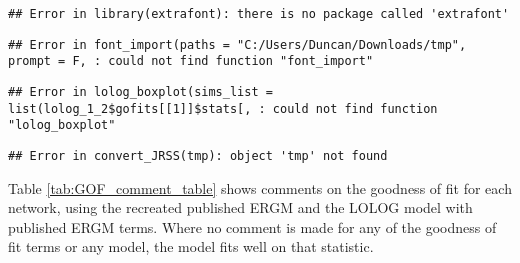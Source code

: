 \documentclass[
]{statsoc}
\begin{document}
\begin{verbatim}
## Error in library(extrafont): there is no package called 'extrafont'
\end{verbatim}

\begin{verbatim}
## Error in font_import(paths = "C:/Users/Duncan/Downloads/tmp", prompt = F, : could not find function "font_import"
\end{verbatim}

\begin{verbatim}
## Error in lolog_boxplot(sims_list = list(lolog_1_2$gofits[[1]]$stats[, : could not find function "lolog_boxplot"
\end{verbatim}

\begin{verbatim}
## Error in convert_JRSS(tmp): object 'tmp' not found
\end{verbatim}

Table \ref{tab:GOF_comment_table} shows comments on the goodness of fit
for each network, using the recreated published ERGM and the LOLOG model
with published ERGM terms. Where no comment is made for any of the
goodness of fit terms or any model, the model fits well on that
statistic.
\end{document}
